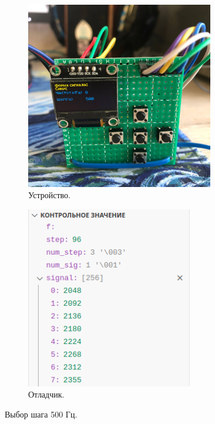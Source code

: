 	\begin{figure}[H]
     \begin{subfigure}[H]{0.5\textwidth}
         \centering
         \includegraphics[width=0.9\textwidth]{../image/test3_u_st.jpg}
         \caption{Устройство.}
     \end{subfigure}
     \hfill
     \begin{subfigure}[H]{0.5\textwidth}
         \centering
         \includegraphics[width=0.8\textwidth]{../image/test3_o_st.png}
         \caption{Отладчик.}
     \end{subfigure}
        \caption{Выбор шага 500 Гц.}
	\end{figure}
	
